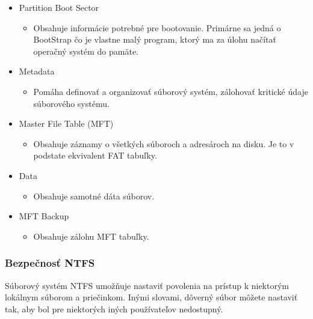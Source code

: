\documentclass[12pt,oneside,slovak,a4paper]{article}
\begin{document}
\begin{itemize}
	\item Partition Boot Sector
		\begin{itemize}
			\item Obsahuje informácie potrebné pre bootovanie. Primárne sa jedná o BootStrap čo je vlastne malý program, ktorý ma za úlohu načítať operačný systém do pamäte.
		\end{itemize}
	\item Metadata
		\begin{itemize}
			\item Pomáha definovať a organizovať súborový systém, zálohovať kritické údaje súborového systému.
		\end{itemize}
	\item Master File Table (MFT)
		\begin{itemize}
			\item Obsahuje záznamy o všetkých súboroch a adresároch na disku. Je to v podstate ekvivalent FAT tabuľky.
		\end{itemize}
	\item Data
		\begin{itemize}
			\item Obsahuje samotné dáta súborov.
		\end{itemize}
	\item MFT Backup
		\begin{itemize}
			\item Obsahuje zálohu MFT tabuľky.
		\end{itemize}
\end{itemize}





\subsubsection{Bezpečnosť NTFS}
Súborový systém NTFS umožňuje nastaviť povolenia na prístup k niektorým lokálnym súborom a priečinkom. Inými slovami, dôverný súbor môžete nastaviť tak, aby bol pre niektorých iných používateľov nedostupný.

\end{document}
